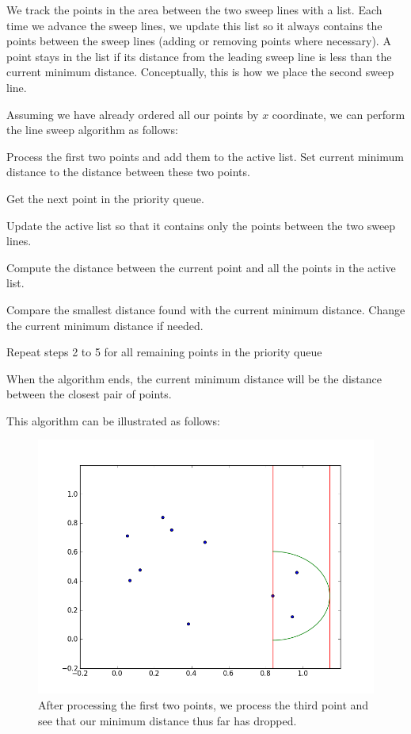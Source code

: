 We track the points in the area between the two sweep lines with a list.
Each time we advance the sweep lines, we update this list so it always contains the points between the sweep lines (adding or removing points where necessary).
A point stays in the list if its distance from the leading sweep line is less than the current minimum distance.
Conceptually, this is how we place the second sweep line.

Assuming we have already ordered all our points by $x$ coordinate, we can perform the line sweep algorithm as follows:

\vspace{5mm}
\begin{compactenum}[1.]
\item 
Process the first two points and add them to the active list.
Set current minimum distance to the distance between these two points.
\item 
Get the next point in the priority queue.
\item 
Update the active list so that it contains only the points between the two sweep lines.
\item 
Compute the distance between the current point and all the points in the active list.
\item 
Compare the smallest distance found with the current minimum distance. 
Change the current minimum distance if needed.
\item 
Repeat steps 2 to 5 for all remaining points in the priority queue
\end{compactenum}
\vspace{5mm}

When the algorithm ends, the current minimum distance will be the distance between the closest pair of points.

This algorithm can be illustrated as follows:
\begin{figure}[H]
\includegraphics[width = \textwidth]{simple1.png}
\caption{After processing the first two points, we process the third point and see that our minimum distance thus far has dropped.}
\end{figure}


